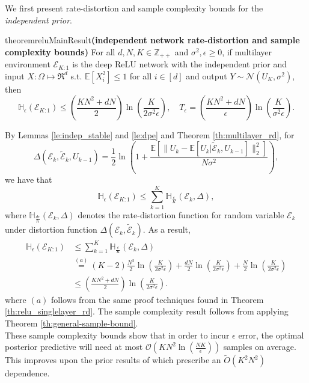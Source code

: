 \documentclass[twoside,11pt]{article}
\renewenvironment{proof}{\par\noindent{\bf Proof\ }}{\hfill\BlackBox\\[2mm]}
\newenvironment{proof}{\par\noindent{\bf Proof\ }}{\hfill\BlackBox\\[2mm]}
\def\environment{\mathcal{E}}
\def\proxy{\tilde{\environment}}
\def\normal{\mathcal{N}}
\def\E{\mathbb{E}}
\def\H{\mathbb{H}}
\begin{document}
We first present rate-distortion and sample complexity bounds for the \emph{independent prior}.
\begin{restatable}{theorem}{reluMainResult}{\bf (independent network rate-distortion and sample complexity bounds)}
    For all $d, N, K\in\mathbb{Z}_{++}$ and $\sigma^2, \epsilon \geq 0$, if multilayer environment $\environment_{K:1}$ is the deep ReLU network with the independent prior and input $X:\Omega\mapsto\Re^d$ s.t. $\E[X_i^2] \leq 1$ for all $i \in [d]$ and output $Y\sim \normal(U_K, \sigma^2)$, then
    $$\H_{\epsilon}(\environment_{K:1}) \leq \left(\frac{KN^2+dN}{2}\right)\ln\left(\frac{K}{2\sigma^2\epsilon}\right),\quad T_\epsilon = \left(\frac{KN^2+dN}{\epsilon}\right)\ln\left(\frac{K}{\sigma^2\epsilon}\right).$$
\end{restatable}
\begin{proof}
    By Lemmas \ref{le:indep_stable} and \ref{le:dpe} and Theorem \ref{th:multilayer_rd}, for 
    $$\Delta(\environment_k, \proxy_k, U_{k-1}) = \frac{1}{2}\ln\left(1 + \frac{\E[\|U_k - \E[U_k|\proxy_k, U_{k-1}]\|^2_2]}{N\sigma^2}\right),$$
    we have that
    $$\H_\epsilon(\environment_{K:1}) \leq \sum_{k=1}^{K} \H_{\frac{\epsilon}{K}}(\environment_k, \Delta),$$
    where $\H_{\frac{d \epsilon}{K}}(\environment_k, \Delta)$ denotes the rate-distortion function for random variable $\environment_k$ under distortion function $\Delta(\environment_k,\proxy_k)$. As a result,
    \begin{align*}
        \H_\epsilon(\environment_{K:1})
        & \leq \sum_{k=1}^{K}\H_{\frac{\epsilon}{K}}(\environment_k, \Delta)\\
        & \overset{(a)}{=} (K-2)\frac{N^2}{2}\ln\left(\frac{K}{2\sigma^2\epsilon}\right) + \frac{dN}{2}\ln\left(\frac{K}{2\sigma^2\epsilon}\right) + \frac{N}{2}\ln\left(\frac{K}{2\sigma^2\epsilon}\right)\\
        & \leq \left(\frac{KN^2+dN}{2}\right)\ln\left(\frac{K}{2\sigma^2\epsilon}\right).
    \end{align*}
    where $(a)$ follows from the same proof techniques found in Theorem \ref{th:relu_singlelayer_rd}.
    The sample complexity result follows from applying Theorem \ref{th:general-sample-bound}.
\end{proof}
These sample complexity bounds show that in order to incur $\epsilon$ error, the optimal posterior predictive will need at most $\mathcal{O}\left(KN^2\ln\left(\frac{NK}{\epsilon}\right)\right)$ samples on average. This improves upon the prior results of \citep{bartlett1998almost, pmlr-v65-harvey17a} which prescribe an $\tilde{O}\left(K^2N^2\right)$ dependence.
\end{document}
